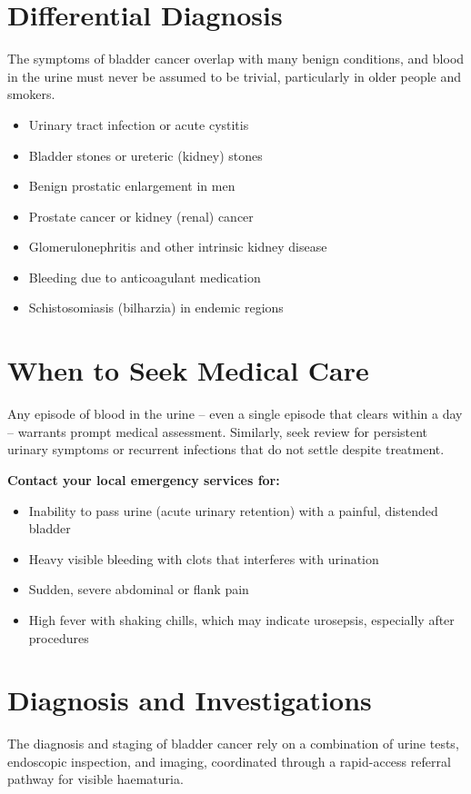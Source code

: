 \section*{Differential Diagnosis}
The symptoms of bladder cancer overlap with many benign conditions, and blood in the urine must never be assumed to be trivial, particularly in older people and smokers.

\begin{itemize}
    \item Urinary tract infection or acute cystitis
    \item Bladder stones or ureteric (kidney) stones
    \item Benign prostatic enlargement in men
    \item Prostate cancer or kidney (renal) cancer
    \item Glomerulonephritis and other intrinsic kidney disease
    \item Bleeding due to anticoagulant medication
    \item Schistosomiasis (bilharzia) in endemic regions
\end{itemize}

\section*{When to Seek Medical Care}
Any episode of blood in the urine -- even a single episode that clears within a day -- warrants prompt medical assessment. Similarly, seek review for persistent urinary symptoms or recurrent infections that do not settle despite treatment.

\textbf{Contact your local emergency services for:}
\begin{itemize}
    \item Inability to pass urine (acute urinary retention) with a painful, distended bladder
    \item Heavy visible bleeding with clots that interferes with urination
    \item Sudden, severe abdominal or flank pain
    \item High fever with shaking chills, which may indicate urosepsis, especially after procedures
\end{itemize}

\section*{Diagnosis and Investigations}
The diagnosis and staging of bladder cancer rely on a combination of urine tests, endoscopic inspection, and imaging, coordinated through a rapid-access referral pathway for visible haematuria.

